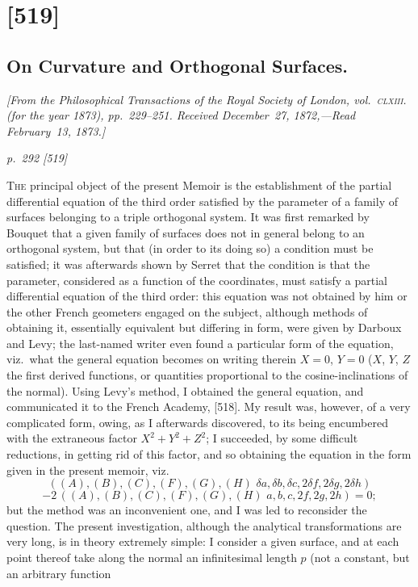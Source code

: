 \documentclass[11pt,a4paper]{article}
\theoremstyle{plain}
\begin{document}
\section{[519]}
\subsection{On Curvature and Orthogonal Surfaces.}

\begin{center}
\textit{[From the Philosophical Transactions of the Royal Society of London, vol.~\textsc{clxiii}. (for the year 1873), pp.~229--251.  Received December~27, 1872,---Read February~13, 1873.]}
\end{center}

\bigskip
\textit{p.~292 [519]}
\smallskip

\textsc{The} principal object of the present Memoir is the establishment of the partial
differential equation of the third order satisfied by the parameter of a family of
surfaces belonging to a triple orthogonal system.  It was first remarked by Bouquet
that a given family of surfaces does not in general belong to an orthogonal system,
but that (in order to its doing so) a condition must be satisfied; it was afterwards
shown by Serret that the condition is that the parameter, considered as a function of
the coordinates, must satisfy a partial differential equation of the third order: this
equation was not obtained by him or the other French geometers engaged on the
subject, although methods of obtaining it, essentially equivalent but differing in form,
were given by Darboux and Levy; the last-named writer even found a particular form
of the equation, viz.\ what the general equation becomes on writing therein $X=0$,
$Y=0$ ($X$, $Y$, $Z$ the first derived functions, or quantities proportional to the cosine-inclinations of the normal).  Using Levy's method, I obtained the general equation, and
communicated it to the French Academy, [518].  My result was, however, of a very
complicated form, owing, as I afterwards discovered, to its being encumbered with the
extraneous factor $X^2 + Y^2 + Z^2$; I succeeded, by some difficult reductions, in getting rid
of this factor, and so obtaining the equation in the form given in the present memoir, viz.
\[
((A), (B), (C), (F), (G), (H)\,\,\delta a, \delta b, \delta c, 2\delta f, 2\delta g, 2\delta h)
\]
\[
- 2\,((A), (B), (C), (F), (G), (H)\,\,a, b, c, 2f, 2g, 2h) = 0;
\]
but the method was an inconvenient one, and I was led to reconsider the question.
The present investigation, although the analytical transformations are very long, is in
theory extremely simple: I consider a given surface, and at each point thereof take
along the normal an infinitesimal length $p$ (not a constant, but an arbitrary function
\end{document}
